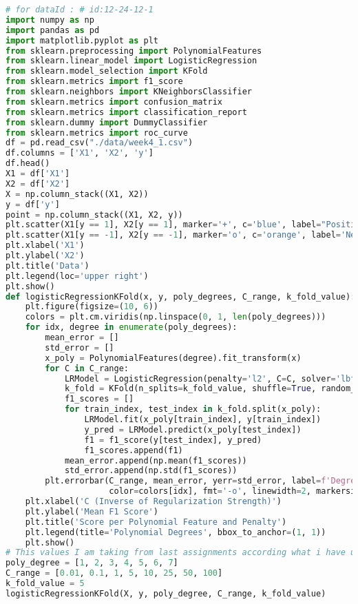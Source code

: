 \documentclass[a4paper,10pt]{article}
\begin{document}
\begin{lstlisting}[language=Python, caption={}]
# for dataId : # id:12-24-12-1
import numpy as np
import pandas as pd
import matplotlib.pyplot as plt
from sklearn.preprocessing import PolynomialFeatures
from sklearn.linear_model import LogisticRegression
from sklearn.model_selection import KFold
from sklearn.metrics import f1_score
from sklearn.neighbors import KNeighborsClassifier
from sklearn.metrics import confusion_matrix
from sklearn.metrics import classification_report
from sklearn.dummy import DummyClassifier
from sklearn.metrics import roc_curve
df = pd.read_csv("./data/week4_1.csv")
df.columns = ['X1', 'X2', 'y']
df.head()
X1 = df['X1']
X2 = df['X2']
X = np.column_stack((X1, X2))
y = df['y']
point = np.column_stack((X1, X2, y))
plt.scatter(X1[y == 1], X2[y == 1], marker='+', c='blue', label="Positive", alpha=0.8, edgecolors='w')
plt.scatter(X1[y == -1], X2[y == -1], marker='o', c='orange', label='Negative', alpha=0.8)
plt.xlabel('X1')
plt.ylabel('X2')
plt.title('Data')
plt.legend(loc='upper right')
plt.show()
def logisticRegressionKFold(x, y, poly_degrees, C_range, k_fold_value):
    plt.figure(figsize=(10, 6))
    colors = plt.cm.viridis(np.linspace(0, 1, len(poly_degrees)))
    for idx, degree in enumerate(poly_degrees):
        mean_error = []
        std_error = []
        x_poly = PolynomialFeatures(degree).fit_transform(x)
        for C in C_range:   
            LRModel = LogisticRegression(penalty='l2', C=C, solver='lbfgs', max_iter=1000)
            k_fold = KFold(n_splits=k_fold_value, shuffle=True, random_state=42)
            f1_scores = []
            for train_index, test_index in k_fold.split(x_poly):
                LRModel.fit(x_poly[train_index], y[train_index])
                y_pred = LRModel.predict(x_poly[test_index])
                f1 = f1_score(y[test_index], y_pred)
                f1_scores.append(f1)        
            mean_error.append(np.mean(f1_scores))
            std_error.append(np.std(f1_scores))
        plt.errorbar(C_range, mean_error, yerr=std_error, label=f'Degree {degree}',
                     color=colors[idx], fmt='-o', linewidth=2, markersize=6)
    plt.xlabel('C (Inverse of Regularization Strength)')
    plt.ylabel('Mean F1 Score')
    plt.title('Score per Polynomial Feature and Penalty')
    plt.legend(title='Polynomial Degrees', bbox_to_anchor=(1, 1))
    plt.show()
# This values I am taking from last assignments according what i have understand    
poly_degree = [1, 2, 3, 4, 5, 6, 7]
C_range = [0.01, 0.1, 1, 5, 10, 25, 50, 100]
k_fold_value = 5
logisticRegressionKFold(X, y, poly_degree, C_range, k_fold_value)

\end{lstlisting}
\end{document}
